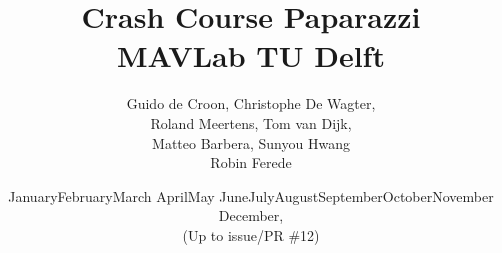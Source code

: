 \documentclass{report}
\newcommand{\todaytext}{\ifcase \month \or January\or February\or March\or %
April\or May \or June\or July\or August\or September\or October\or November\or %
December\fi, \number \year}
\begin{document}
\author{Guido de Croon, Christophe De Wagter, \\Roland Meertens, Tom van Dijk, \\Matteo Barbera, Sunyou Hwang \\Robin Ferede}
\title{\bf Crash Course Paparazzi \the\year\\MAVLab TU Delft}
\date{\todaytext\\(Up to issue/PR \#12)}
\maketitle

\tableofcontents

\setlength{\parindent}{0em}





	
\end{document}
